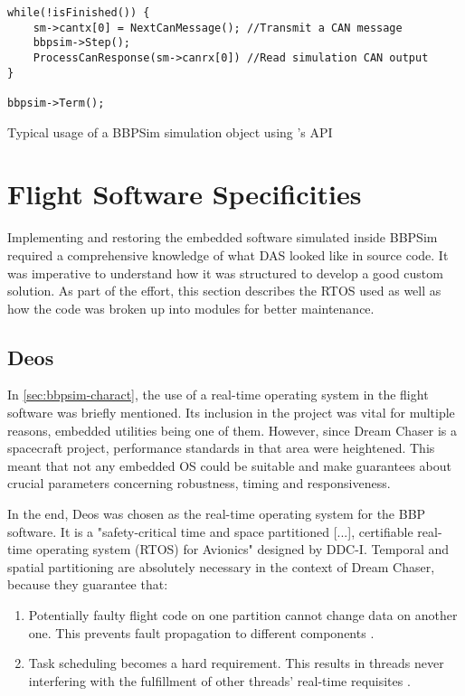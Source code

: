 {\begin{listing}[H]
\begin{verbatim}
while(!isFinished()) {
	sm->cantx[0] = NextCanMessage(); //Transmit a CAN message
	bbpsim->Step();
	ProcessCanResponse(sm->canrx[0]) //Read simulation CAN output
}

bbpsim->Term();
	\end{verbatim}
	\caption{Typical usage of a BBPSim simulation object using 's API}
	\label{code:example-bbpsim-usage}
\end{listing}

\section{Flight Software Specificities}\label{sec:fsw-outline}
Implementing and restoring the embedded software simulated inside \gls{BBPSim} required a comprehensive knowledge of what DAS looked like in source code. It was imperative to understand how it was structured to develop a good custom solution.  As part of the effort, this section describes the RTOS used as well as how the code was broken up into modules for better maintenance.

\subsection*{Deos}
In \autoref{sec:bbpsim-charact}, the use of a real-time operating system in the flight software was briefly mentioned. Its inclusion in the project was vital for multiple reasons, embedded utilities being one of them. However, since Dream Chaser is a spacecraft project, performance standards in that area were heightened. This meant that not any embedded OS could be suitable and make guarantees about crucial parameters concerning robustness, timing and responsiveness.

In the end, Deos was chosen as the real-time operating system for the BBP software. It is a "safety-critical time and space partitioned [...], certifiable real-time operating system (RTOS) for Avionics" designed by DDC-I\cite{on:ddci}. Temporal and spatial partitioning are absolutely necessary in the context of Dream Chaser, because they guarantee that:
\begin{enumerate}
	\item Potentially faulty flight code on one partition cannot change data on another one. This prevents fault propagation to different components \cite{reiger}.
	\item Task scheduling becomes a hard requirement. This results in threads never interfering with the fulfillment of other threads' real-time requisites \cite{rufino}.
\end{enumerate}

}
